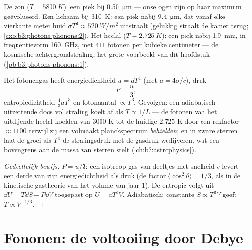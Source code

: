 \begin{example}\label{ex:b3:photons-phonons:thermometers}
De zon ($T = \qty{5800}{K}$): een piek bij \qty{0.50}{\micro m} --- onze
ogen zijn op haar maximum geëvolueerd. Een lichaam bij \qty{310}{K}: een
piek nabij \qty{9.4}{\micro m}, dat vanaf elke vierkante meter huid
$\sigma T^4 \approx
\qty{520}{W/m^2}$ uitstraalt (gelukkig straalt de
kamer terug; \cref{exo:b3:photons-phonons:2}). Het heelal ($T =
\qty{2.725}{K}$): een piek nabij \qty{1.9}{mm}, in frequentievorm
\qty{160}{GHz}, met $411$ fotonen per kubieke centimeter --- de kosmische
achtergrondstraling, het grote voorbeeld van dit hoofdstuk
(\cref{pb:b3:photons-phonons:1}).
\end{example}

\begin{proposition}\label{prop:b3:photons-phonons:thermo}
Het fotonengas heeft energiedichtheid $u = aT^4$ (met $a =
4\sigma/c$),
druk
\[
P = \frac u3 ,
\]
entropiedichtheid $\tfrac43 aT^3$ en fotonaantal $\propto T^3$. Gevolgen:
een adiabatisch uitzettende doos vol straling koelt af als $T \propto 1/L$
--- de fotonen van het uitdijende heelal koelden van $3000$ K tot de
huidige $2.725$ K door een rekfactor $\approx1100$ terwijl zij een
volmaakt planckspectrum \emph{behielden}; en in zware sterren laat de groei
als $T^4$ de stralingsdruk met de gasdruk wedijveren, wat een bovengrens
aan de massa van sterren stelt (\cref{ch:b3:astrophysics}).
\end{proposition}

\begin{proof}[Gedeeltelijk bewijs]
$P = u/3$: een isotroop gas van deeltjes met snelheid $c$ levert een derde
van zijn energiedichtheid als druk (de factor $\langle
\cos^2\theta\rangle = 1/3$, als in de kinetische gastheorie van het volume
van jaar 1). De entropie volgt uit $\dd U = T\dd S - P\dd V$ toegepast op
$U =
aT^4V$. Adiabatisch: constante $S \propto T^3V$ geeft $T \propto
V^{-1/3}$.
\end{proof}

\section{Fononen: de voltooiing door Debye}

